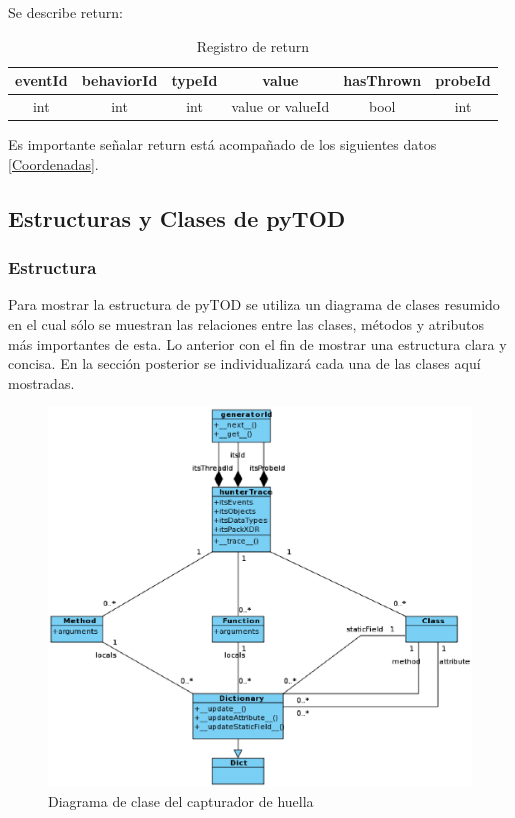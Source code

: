 \documentclass[12pt,legalpaper]{report}
\begin{document}
Se describe return:\\

\begin{table}[!h]
\begin{center}
\begin{tabular}{| c | c | c | c | c | c |}
\hline
\rowcolor[gray]{0.9}eventId & behaviorId & typeId & value & hasThrown & probeId \\
\hline
int & int & int & value or valueId\footnotemark[1] & bool & int\\
\hline
\end{tabular}
\caption{Registro de return} 
\end{center}
\end{table}

Es importante señalar return está acompañado de los siguientes datos \ref{Coordenadas}.

		
		
		
		\subsection{Estructuras y Clases de pyTOD}
		
		
		  	\subsubsection{Estructura}

Para mostrar la estructura de pyTOD se utiliza un diagrama de clases resumido en el cual sólo se muestran las relaciones entre las clases, métodos y atributos más importantes de esta.  Lo anterior con el fin de mostrar una estructura clara y concisa.  En la sección posterior se individualizará cada una de las clases aquí mostradas. 
			
\begin{figure}[!h]
	\centering
	\includegraphics[scale=0.6]{images/classModelHunterTrace.eps}
	\caption{Diagrama de clase del capturador de huella}
\end{figure}			
			
\end{document}
